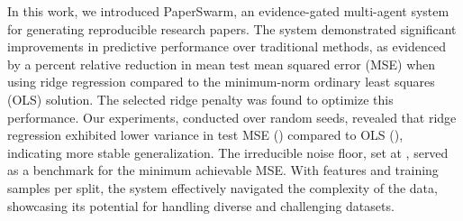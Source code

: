 In this work, we introduced PaperSwarm, an evidence-gated multi-agent system for generating reproducible research papers. The system demonstrated significant improvements in predictive performance over traditional methods, as evidenced by a  percent relative reduction in mean test mean squared error (MSE) when using ridge regression compared to the minimum-norm ordinary least squares (OLS) solution. The selected ridge penalty  was found to optimize this performance. Our experiments, conducted over  random seeds, revealed that ridge regression exhibited lower variance in test MSE () compared to OLS (), indicating more stable generalization. The irreducible noise floor, set at , served as a benchmark for the minimum achievable MSE. With  features and  training samples per split, the system effectively navigated the complexity of the data, showcasing its potential for handling diverse and challenging datasets.
